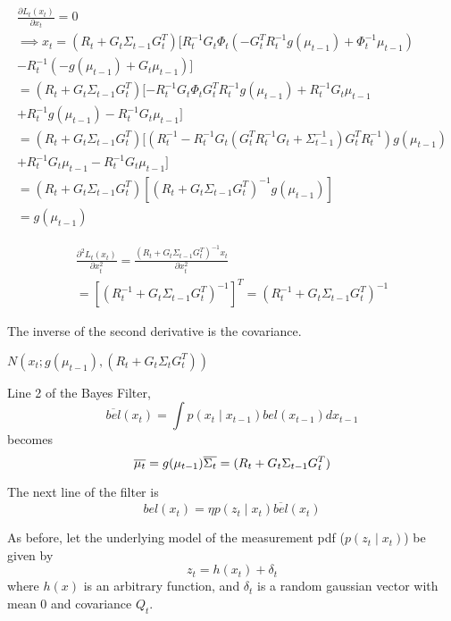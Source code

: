 \begin{multline}
\frac{\partial L_t(x_t)}{\partial x_t} = 0 \\
\implies x_t = (R_t + G_t\Sigma_{t-1}G_t^T) [R_t^{-1}G_t\Phi_t(-G_t^TR_t^{-1}g(\mu_{t-1}) + \Phi_t^{-1}\mu_{t-1}) \\ - R_t^{-1}(-g(\mu_{t-1}) + G_t\mu_{t-1})] \\
= (R_t + G_t\Sigma_{t-1}G_t^T) [-R_t^{-1}G_t\Phi_tG_t^TR_t^{-1}g(\mu_{t-1}) + R_t^{-1}G_t\mu_{t-1} \\ + R_t^{-1}g(\mu_{t-1}) - R_t^{-1}G_t\mu_{t-1}] \\
= (R_t + G_t\Sigma_{t-1}G_t^T) [(R_t^{-1} - R_t^{-1}G_t(G_t^TR_t^{-1}G_t + \Sigma_{t-1}^{-1})G_t^TR_t^{-1})g(\mu_{t-1}) \\
+ R_t^{-1}G_t\mu_{t-1} - R_t^{-1}G_t\mu_{t-1}] \\
= (R_t + G_t\Sigma_{t-1}G_t^T)[(R_t + G_t\Sigma_{t-1}G_t^T)^{-1} g(\mu_{t-1})] \\
= g(\mu_{t-1})
\end{multline}

\begin{multline}
\frac{\partial^2 L_t(x_t) }{\partial x_t^2} = \frac{(R_t + G_t\Sigma_{t-1}G_t^T)^{-1}x_t}{\partial x_t^2} \\
= [(R_t^{-1} + G_t\Sigma_{t-1}G_t^T)^{-1}]^T = (R_t^{-1} + G_t\Sigma_{t-1}G_t^T)^{-1}
\end{multline}

The inverse of the second derivative is the covariance.

\(N(x_t;g(\mu_{t-1}),(R_t + G_t\Sigma_tG_t^T))\)

Line 2 of the Bayes Filter, 
\[
\overline{bel}(x_t) = \int p(x_t \mathbin{\vert} x_{t-1}) bel(x_{t-1})dx_{t-1}
\]
becomes 
\[
\overline{\mu_t} = g(\mu_{t-1}) \\
\overline{\Sigma_t} = (R_t + G_t\Sigma_{t-1}G_t^T)
\]

The next line of the filter is 
\[
bel(x_t) = \eta p(z_t \mathbin{\vert} x_t) \overline{bel}(x_t)
\]

As before, let the underlying model of the measurement pdf (\(p(z_t \mathbin{\vert} x_t)\)) be given by \[z_t =  h(x_t) + \delta_t\] where \(h(x)\) is an arbitrary function, and \(\delta_t\) is a random gaussian vector with mean 0 and covariance \(Q_t\).

